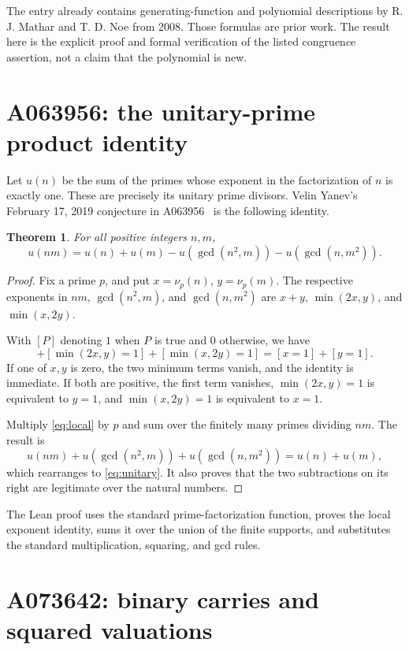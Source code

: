 \documentclass[11pt]{article}
\newtheorem{theorem}{Theorem}[section]
\begin{document}
The entry already contains generating-function and polynomial descriptions
by R. J. Mathar and T. D. Noe from 2008. Those formulas are prior work.
The result here is the explicit proof and formal verification of the
listed congruence assertion, not a claim that the polynomial is new.

\section{A063956: the unitary-prime product identity}

Let $u(n)$ be the sum of the primes whose exponent in the factorization of
$n$ is exactly one. These are precisely its unitary prime divisors.
Velin Yanev's February 17, 2019 conjecture in A063956~\cite{A063956} is
the following identity.

\begin{theorem}
For all positive integers $n,m$,
\begin{equation}
 u(nm)=u(n)+u(m)-u(\gcd(n^2,m))-u(\gcd(n,m^2)).
 \label{eq:unitary}
\end{equation}
\end{theorem}
\begin{proof}
Fix a prime $p$, and put $x=\nu_p(n)$, $y=\nu_p(m)$. The respective
exponents in $nm$, $\gcd(n^2,m)$, and $\gcd(n,m^2)$ are
$x+y$, $\min(2x,y)$, and $\min(x,2y)$.

With $[P]$ denoting $1$ when $P$ is true and $0$ otherwise, we have
\begin{equation}
 [x+y=1]+[\min(2x,y)=1]+[\min(x,2y)=1]=[x=1]+[y=1].
 \label{eq:local}
\end{equation}
If one of $x,y$ is zero, the two minimum terms vanish, and the identity
is immediate. If both are positive, the first term vanishes,
$\min(2x,y)=1$ is equivalent to $y=1$, and $\min(x,2y)=1$ is equivalent
to $x=1$.

Multiply \eqref{eq:local} by $p$ and sum over the finitely many primes
dividing $nm$. The result is
\[
 u(nm)+u(\gcd(n^2,m))+u(\gcd(n,m^2))=u(n)+u(m),
\]
which rearranges to \eqref{eq:unitary}. It also proves that the two
subtractions on its right are legitimate over the natural numbers.
\end{proof}

The Lean proof uses the standard prime-factorization function, proves the
local exponent identity, sums it over the union of the finite supports,
and substitutes the standard multiplication, squaring, and gcd rules.

\section{A073642: binary carries and squared valuations}
\end{document}

